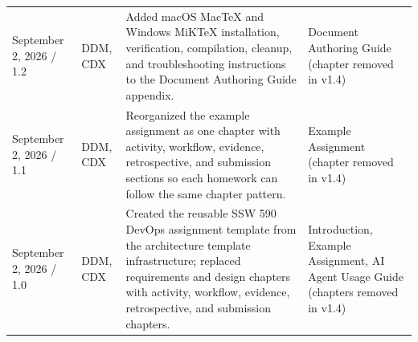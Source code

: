\begin{tabularx}{\linewidth}{L{3.1cm}L{2.2cm}YL{2.0cm}}
September 2, 2026 / 1.2 & DDM, CDX & Added macOS MacTeX and Windows MiKTeX installation, verification, compilation, cleanup, and troubleshooting instructions to the Document Authoring Guide appendix. & Document Authoring Guide (chapter removed in v1.4)\\
September 2, 2026 / 1.1 & DDM, CDX & Reorganized the example assignment as one chapter with activity, workflow, evidence, retrospective, and submission sections so each homework can follow the same chapter pattern. & Example Assignment (chapter removed in v1.4)\\
September 2, 2026 / 1.0 & DDM, CDX & Created the reusable SSW 590 DevOps assignment template from the architecture template infrastructure; replaced requirements and design chapters with activity, workflow, evidence, retrospective, and submission chapters. & Introduction, Example Assignment, AI Agent Usage Guide (chapters removed in v1.4)\\
\end{tabularx}
